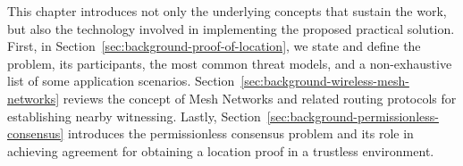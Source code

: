 This chapter introduces not only the underlying concepts that sustain the work, but also the technology involved in implementing the proposed practical solution. First, in Section~\ref{sec:background-proof-of-location}, we state and define the \pol{} problem, its participants, the most common threat models, and a non-exhaustive list of some application scenarios. Section~\ref{sec:background-wireless-mesh-networks} reviews the concept of Mesh Networks and related routing protocols for establishing nearby witnessing. Lastly, Section~\ref{sec:background-permissionless-consensus} introduces the permissionless consensus problem and its role in achieving agreement for obtaining a location proof in a trustless environment.